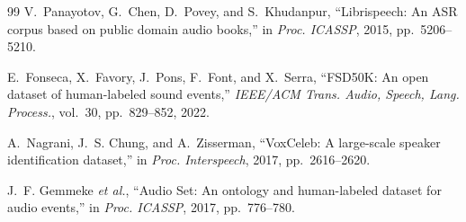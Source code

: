 \documentclass[lettersize,journal]{IEEEtran}
\begin{document}
\begin{thebibliography}{99}
V.~Panayotov, G.~Chen, D.~Povey, and S.~Khudanpur, ``Librispeech: An ASR corpus based on public domain audio books,'' in \emph{Proc. ICASSP}, 2015, pp.~5206--5210.

E.~Fonseca, X.~Favory, J.~Pons, F.~Font, and X.~Serra, ``FSD50K: An open dataset of human-labeled sound events,'' \emph{IEEE/ACM Trans. Audio, Speech, Lang. Process.}, vol.~30, pp.~829--852, 2022.

A.~Nagrani, J.~S. Chung, and A.~Zisserman, ``VoxCeleb: A large-scale speaker identification dataset,'' in \emph{Proc. Interspeech}, 2017, pp.~2616--2620.

J.~F. Gemmeke \emph{et al.}, ``Audio Set: An ontology and human-labeled dataset for audio events,'' in \emph{Proc. ICASSP}, 2017, pp.~776--780.

\end{thebibliography}
\end{document}
